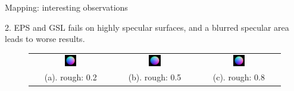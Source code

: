 \documentclass[10pt]{beamer}
\begin{document}
\begin{frame}{Mapping: interesting observations}
\begin{exampleblock}{2. EPS and GSL fails on highly specular surfaces, and a blurred specular area leads to worse results.}
\begin{figure}
\begin{tabular}{ccc}
\includegraphics[width=0.15\textwidth]{mapping/ps_spec_rough/0802_normal}&
\includegraphics[width=0.15\textwidth]{mapping/ps_spec_rough/0805_normal}&
\includegraphics[width=0.15\textwidth]{mapping/ps_spec_rough/0808_normal}\\
(a). rough: 0.2 & (b). rough: 0.5 & (c). rough: 0.8
\end{tabular}
\end{figure}
\end{exampleblock}

\end{frame}

\end{document}
